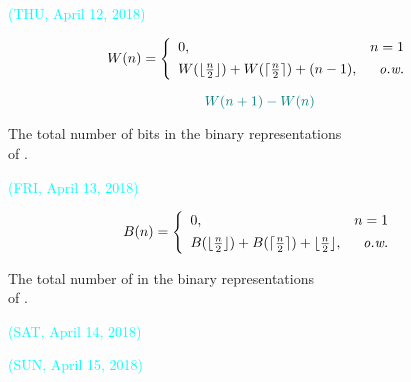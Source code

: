\begin{frame}{}
  {\vspace{-0.50cm} \centerline{\textcolor{cyan}{\small (THU, April 12, 2018)}}}

  \vspace{0.30cm}
  \[
    W(n) = \left\{\begin{array}{lr}
      0,	& n = 1 \\[4pt]
      W(\lfloor \frac{n}{2} \rfloor) + W(\lceil \frac{n}{2} \rceil) + (n - 1), & \text{\it o.w.}
    \end{array}\right.
  \]

  \vspace{0.30cm}
  \[
    \textcolor{teal}{W(n+1) - W(n)}
  \]

  \vspace{0.10cm}
  \begin{center}
    {\large {The total number of bits in the binary representations \\ of .}}
  \end{center}
\end{frame}

\begin{frame}{}
  {\vspace{-0.50cm} \centerline{\textcolor{cyan}{\small (FRI, April 13, 2018)}}}

  \vspace{0.30cm}
  \[
    B(n) = \left\{\begin{array}{lr}
      0,	& n = 1 \\[4pt]
      B(\lfloor \frac{n}{2} \rfloor) + B(\lceil \frac{n}{2} \rceil) + \lfloor \frac{n}{2} \rfloor, & \text{\it o.w.}
    \end{array}\right.
  \]

  \vspace{0.30cm}
  \begin{center}
    {\large {The total number of  in the binary representations \\ of .}}
  \end{center}
\end{frame}

\begin{frame}{}
  {\vspace{-0.50cm} \centerline{\textcolor{cyan}{\small (SAT, April 14, 2018)}}}

\end{frame}

\begin{frame}{}
  {\vspace{-0.50cm} \centerline{\textcolor{cyan}{\small (SUN, April 15, 2018)}}}

\end{frame}
